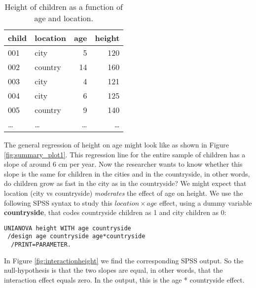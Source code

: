  
 
 
 \begin{table}
 \caption{Height of children as a function of age and location.}
 \begin{tabular}{llrr}
 child & location & age & height\\ \hline
 001 & city & 5 & 120\\
 002 & country & 14 & 160\\
 003 & city & 4 & 121\\
 004 & city & 6 & 125\\
 005 & country & 9 & 140\\
 \dots & \dots & \dots & \dots\\
 \end{tabular}
 \label{tab:location}
 \end{table}



\begin{knitrout}
\color{fgcolor}\begin{kframe}


{\ttfamily\noindent\bfseries{}}\end{kframe}
\end{knitrout}

The general regression of height on age might look like as shown in Figure \ref{fig:summary_plot1}. This regression line for the entire sample of children has a slope of around 6 cm per year. Now the researcher wants to know whether this slope is the same for children in the cities and in the countryside, in other words, do children grow as fast in the city as in the countryside? We might expect that location (city vs countryside) \textit{moderates} the effect of age on height. We use the following SPSS syntax to study this $location \times age$ effect, using a dummy variable \textbf{countryside}, that codes countryside children as 1 and city children as 0:

\begin{verbatim}
UNIANOVA height WITH age countryside
 /design age countryside age*countryside
  /PRINT=PARAMETER.
\end{verbatim}


In Figure \ref{fig:interactionheight} we find the corresponding SPSS output. So the null-hypothesis is that the two slopes are equal, in other words, that the interaction effect equals zero. In the output, this is the age * countryside effect.


